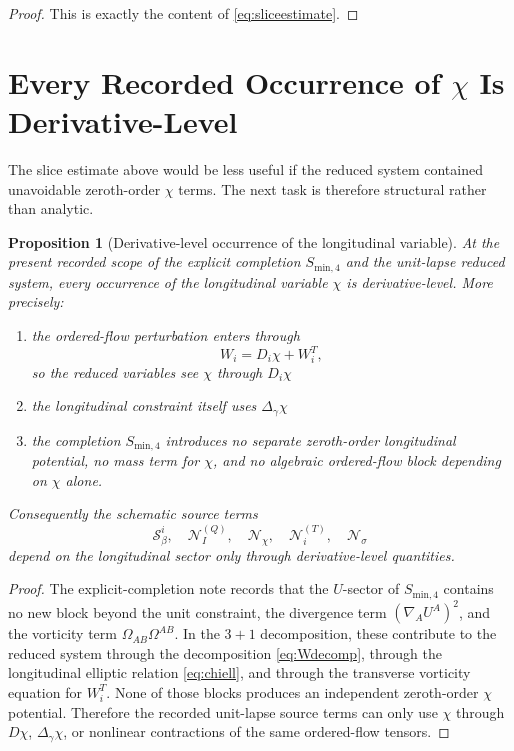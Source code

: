 \documentclass[11pt]{article}
\newtheorem{proposition}{Proposition}
\begin{document}
\begin{proof}
This is exactly the content of \eqref{eq:sliceestimate}.
\end{proof}

\section{Every Recorded Occurrence of \texorpdfstring{\(\chi\)}{chi} Is Derivative-Level}

The slice estimate above would be less useful if the reduced system contained unavoidable zeroth-order \(\chi\) terms. The next task is therefore structural rather than analytic.

\begin{proposition}[Derivative-level occurrence of the longitudinal variable]
\label{prop:derivative}
At the present recorded scope of the explicit completion \(S_{\mathrm{min},4}\) and the unit-lapse reduced system, every occurrence of the longitudinal variable \(\chi\) is derivative-level. More precisely:
\begin{enumerate}
    \item the ordered-flow perturbation enters through
    \begin{equation}
    W_i = D_i\chi + W_i^T,
    \label{eq:Wdecomp}
    \end{equation}
    so the reduced variables see \(\chi\) through \(D_i\chi\)
    \item the longitudinal constraint itself uses \(\Delta_\gamma\chi\)
    \item the completion \(S_{\mathrm{min},4}\) introduces no separate zeroth-order longitudinal potential, no mass term for \(\chi\), and no algebraic ordered-flow block depending on \(\chi\) alone.
\end{enumerate}
Consequently the schematic source terms
\[
\mathcal S_\beta^i,\quad
\mathcal N_I^{(Q)},\quad
\mathcal N_\chi,\quad
\mathcal N_i^{(T)},\quad
\mathcal N_\sigma
\]
depend on the longitudinal sector only through derivative-level quantities.
\end{proposition}

\begin{proof}
The explicit-completion note records that the \(U\)-sector of \(S_{\mathrm{min},4}\) contains no new block beyond the unit constraint, the divergence term \((\nabla_AU^A)^2\), and the vorticity term \(\Omega_{AB}\Omega^{AB}\). In the \(3+1\) decomposition, these contribute to the reduced system through the decomposition \eqref{eq:Wdecomp}, through the longitudinal elliptic relation \eqref{eq:chiell}, and through the transverse vorticity equation for \(W_i^T\). None of those blocks produces an independent zeroth-order \(\chi\) potential. Therefore the recorded unit-lapse source terms can only use \(\chi\) through \(D\chi\), \(\Delta_\gamma\chi\), or nonlinear contractions of the same ordered-flow tensors.
\end{proof}
\end{document}
